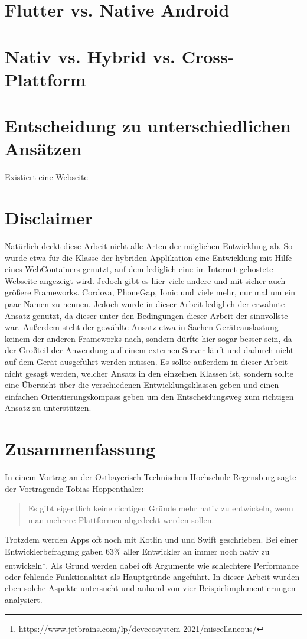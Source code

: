 \section{Flutter vs. Native Android}
\section{Nativ vs. Hybrid vs. Cross-Plattform}

\section{Entscheidung zu unterschiedlichen Ansätzen}
Existiert eine Webseite

\section{Disclaimer}
Natürlich deckt diese Arbeit nicht alle Arten der möglichen Entwicklung ab. So wurde etwa für die Klasse der hybriden Applikation eine Entwicklung mit Hilfe eines WebContainers genutzt, auf dem lediglich eine im Internet gehostete Webseite angezeigt wird. Jedoch gibt es hier viele andere und mit sicher auch größere Frameworks. Cordova, PhoneGap, Ionic und viele mehr, nur mal um ein paar Namen zu nennen. Jedoch wurde in dieser Arbeit lediglich der erwähnte Ansatz genutzt, da dieser unter den Bedingungen dieser Arbeit der sinnvollste war. Außerdem steht der gewählte Ansatz etwa in Sachen Geräteauslastung keinem der anderen Frameworks nach, sondern dürfte hier sogar besser sein, da der Großteil der Anwendung auf einem externen Server läuft und dadurch nicht auf dem Gerät ausgeführt werden müssen. Es sollte außerdem in dieser Arbeit nicht gesagt werden, welcher Ansatz in den einzelnen Klassen ist, sondern sollte eine Übersicht über die verschiedenen Entwicklungsklassen geben und einen einfachen Orientierungskompass geben um den Entscheidungsweg zum richtigen Ansatz zu unterstützen.

\section{Zusammenfassung}
In einem Vortrag an der Ostbayerisch Technischen Hochschule Regensburg sagte der Vortragende Tobias Hoppenthaler:
\begin{quote}
Es gibt eigentlich keine richtigen Gründe mehr nativ zu entwickeln, wenn man mehrere Plattformen abgedeckt werden sollen.
\end{quote}
Trotzdem werden Apps oft noch mit Kotlin und und Swift geschrieben. Bei einer Entwicklerbefragung gaben 63\% aller Entwickler an immer noch nativ zu entwickeln\footnote{https://www.jetbrains.com/lp/devecosystem-2021/miscellaneous/}. Als Grund werden dabei oft Argumente wie schlechtere Performance oder fehlende Funktionalität als Hauptgründe angeführt. In dieser Arbeit wurden eben solche Aspekte untersucht und anhand von vier Beispielimplementierungen analysiert. 

